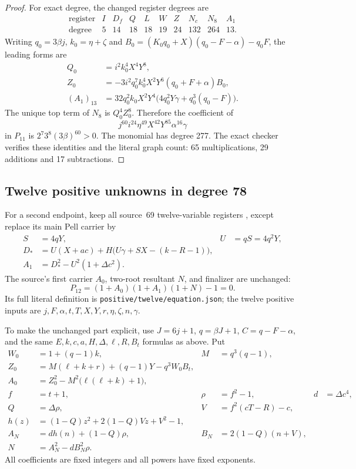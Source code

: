 \begin{proof}
For exact degree, the changed register degrees are
\[
\begin{array}{c|rrrrrrrrr}
\text{register}&I&D_f&Q&L&W&Z&N_c&N_8&A_1\\\hline
\text{degree}&5&14&18&18&19&24&132&264&13.
\end{array}
\]
Writing $q_0=3\beta j$, $k_0=\eta+\zeta$ and
$B_0=(K_0q_0+X)(q_0-F-\alpha)-q_0F$, the leading forms are
\begin{align*}
 Q_0&=i^2k_0^4X^4Y^8,\\
 Z_0&=-3i^2q_0^7k_0^4X^2Y^6(q_0+F+\alpha)B_0,\\
 (A_1)_{13}&=32q_0^2k_0X^2Y^4
      \bigl(4q_0^2Y\gamma+q_0^3(q_0-F)\bigr).
\end{align*}
The unique top term of $N_8$ is $Q_0^4Z_0^8$. Therefore the coefficient
of
\[
 j^{60}i^{24}\eta^{49}X^{42}Y^{85}\alpha^{16}\gamma
\]
in $P_{11}$ is $2^7 3^8(3\beta)^{60}>0$. The monomial has degree 277.
The exact checker verifies these identities and the literal graph count:
65 multiplications, 29 additions and 17 subtractions.
\end{proof}

\subsection{Twelve positive unknowns in degree 78}

For a second endpoint, keep all source~69 twelve-variable registers
\cite{source69}, except replace its main Pell carrier by
\begin{align*}
 S&=4qY, & U&=qS=4q^2Y,\\
 D_*&=U(X+ac)+H\bigl(U\gamma+SX-(k-R-1)\bigr),\\
 A_1&=D_*^2-U^2(1+\Delta c^2).
\end{align*}
The source's first carrier $A_0$, two-root resultant $N$, and finalizer
are unchanged:
\begin{equation}
 \boxed{P_{12}=(1+A_0)(1+A_1)(1+N)-1=0.}
 \label{eq:positive78}
\end{equation}
Its full literal definition is
\texttt{positive/twelve/equation.json}; the twelve positive inputs are
$j,F,\alpha,t,T,X,Y,r,\eta,\zeta,n,\gamma$.

To make the unchanged part explicit, use $J=6j+1$, $q=\beta J+1$,
$C=q-F-\alpha$, and the same $E,k,c,a,H,\Delta,\ell,R,B_t$ formulas
as above. Put
\begin{align*}
 W_0&=1+(q-1)k,& M&=q^3(q-1),\\
 Z_0&=M(\ell+k+r)+(q-1)Y-q^3W_0B_t,\\
 A_0&=Z_0^2-M^2\bigl(\ell(\ell+k)+1\bigr),\\
 f&=t+1,& \rho&=f^2-1,& d&=\Delta c^4,\\
 Q&=\Delta\rho,& V&=f^2(cT-R)-c,\\
 h(z)&=(1-Q)z^2+2(1-Q)Vz+V^2-1,\\
 A_N&=dh(n)+(1-Q)\rho,& B_N&=2(1-Q)(n+V),\\
 N&=A_N^2-dB_N^2\rho.
\end{align*}
All coefficients are fixed integers and all powers have fixed exponents.

